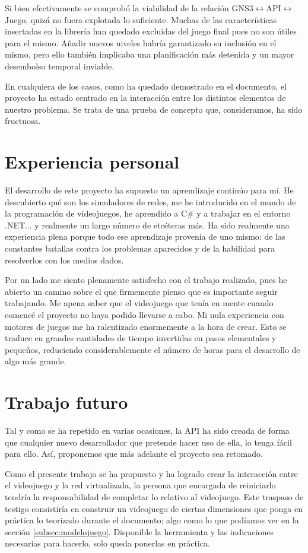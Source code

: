 Si bien efectivamente se comprobó la viabilidad de la relación GNS3$\leftrightarrow$API$\leftrightarrow$Juego, quizá no fuera explotada lo suficiente. Muchas de las características insertadas en la librería han quedado excluidas del juego final pues no son útiles para el mismo. Añadir nuevos niveles habría garantizado su inclusión en el mismo, pero ello también implicaba una planificación más detenida y un mayor desembolso temporal inviable.

En cualquiera de los casos, como ha quedado demostrado en el documento, el proyecto ha estado centrado en la interacción entre los distintos elementos de nuestro problema. Se trata de una prueba de concepto que, consideramos, ha sido fructuosa.

\section{Experiencia personal}
El desarrollo de este proyecto ha supuesto un aprendizaje continúo para mí. He descubierto qué son los simuladores de redes, me he introducido en el mundo de la programación de videojuegos, he aprendido a C\# y a trabajar en el entorno .NET... y realmente un largo número de etcéteras más. Ha sido realmente una experiencia plena porque todo ese aprendizaje provenía de uno mismo: de las constantes batallas contra los problemas aparecidos y de la habilidad para resolverlos con los medios dados.

Por un lado me siento plenamente satisfecho con el trabajo realizado, pues he abierto un camino sobre el que firmemente pienso que es importante seguir trabajando. Me apena saber que el videojuego que tenía en mente cuando comencé el proyecto no haya podido llevarse a cabo. Mi nula experiencia con motores de juegos me ha ralentizado enormemente a la hora de crear. Esto se traduce en grandes cantidades de tiempo invertidas en pasos elementales y pequeños, reduciendo considerablemente el número de horas para el desarrollo de algo más grande.

\section{Trabajo futuro}
Tal y como se ha repetido en varias ocasiones, la API ha sido creada de forma que cualquier nuevo desarrollador que pretende hacer uso de ella, lo tenga fácil para ello. Así, proponemos que más adelante el proyecto sea retomado. 

Como el presente trabajo se ha propuesto y ha logrado crear la interacción entre el videojuego y la red virtualizada, la persona que encargada de reiniciarlo tendría la responsabilidad de completar lo relativo al videojuego. Este traspaso de testigo consistiría en construir un videojuego de ciertas dimensiones que ponga en práctica lo teorizado durante el documento; algo como lo que podíamos ver en la sección \ref{subsec:modelojuego}. Disponible la herramienta y las indicaciones necesarias para hacerlo, solo queda ponerlas en práctica.